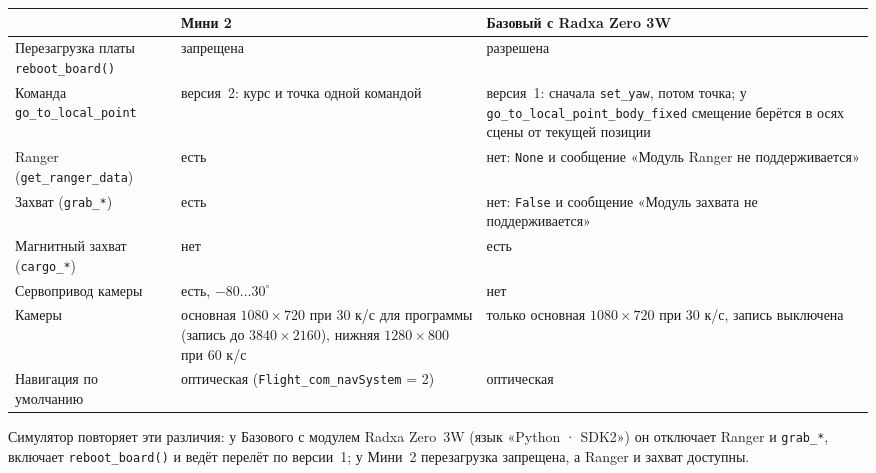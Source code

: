 \begin{center}
\small
\begin{tabularx}{\linewidth}{@{}l >{\raggedright\arraybackslash}X >{\raggedright\arraybackslash}X@{}}
\toprule
& \textbf{Мини 2} & \textbf{Базовый с Radxa Zero 3W} \\
\midrule
Перезагрузка платы \verb|reboot_board()| & запрещена & разрешена \\
Команда \verb|go_to_local_point| & версия~2: курс и точка одной командой & версия~1: сначала \verb|set_yaw|, потом точка; у \verb|go_to_local_point_body_fixed| смещение берётся в осях сцены от текущей позиции \\
Ranger (\verb|get_ranger_data|) & есть & нет: \verb|None| и сообщение «Модуль Ranger не поддерживается» \\
Захват (\verb|grab_*|) & есть & нет: \verb|False| и сообщение «Модуль захвата не поддерживается» \\
Магнитный захват (\verb|cargo_*|) & нет & есть \\
Сервопривод камеры & есть, $-80\ldots30^\circ$ & нет \\
Камеры & основная $1080\times720$ при 30 к/с для программы (запись до $3840\times2160$), нижняя $1280\times800$ при 60 к/с & только основная $1080\times720$ при 30 к/с, запись выключена \\
Навигация по умолчанию & оптическая (\texttt{Flight\_com\_navSystem} = 2) & оптическая \\
\bottomrule
\end{tabularx}
\end{center}

Симулятор повторяет эти различия: у Базового с модулем Radxa Zero~3W (язык «Python · SDK2») он отключает Ranger и \verb|grab_*|, включает \verb|reboot_board()| и ведёт перелёт по версии~1; у Мини~2 перезагрузка запрещена, а Ranger и захват доступны.

